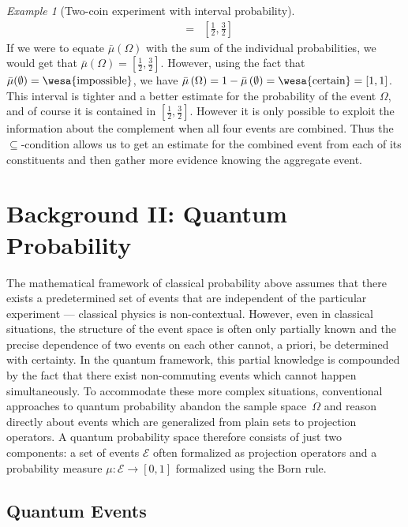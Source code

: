 \documentclass{article}
\theoremstyle{remark}
\newtheorem{example}{Example}
\newcommand{\qevents}{\ensuremath{\mathcal{E}}}
\newcommand{\imposs}{{\mbox{\wesa{impossible}}}}
\newcommand{\necess}{{\mbox{\wesa{certain}}}}
\begin{document}
\begin{example}[Two-coin experiment with interval probability]
\begin{eqnarray*}
&=& \left[\frac{1}{2},\frac{3}{2}\right]
\end{eqnarray*}
If we were to equate $\bar{\mu}(\Omega)$ with the sum of the individual
probabilities, we would get that $\bar{\mu}(\Omega)=\left[\frac{1}{2},\frac{3}{2}\right]$.
However, using the fact that $\bar{\mu}(\emptyset)=\imposs$, we have
$\bar{\mu}\left(\Omega\right)=1-\bar{\mu}\left(\emptyset\right)=\necess=[1,1]$.
This interval is tighter and a better estimate for the probability
of the event $\Omega$, and of course it is contained in $[\frac{1}{2},\frac{3}{2}]$.
However it is only possible to exploit the information about the complement
when all four events are combined. Thus the $\subseteq$-condition
allows us to get an estimate for the combined event from each of its
constituents and then gather more evidence knowing the aggregate
event.
\end{example}

\section{Background II: Quantum Probability}
 
The mathematical framework of classical probability above assumes that
there exists a predetermined set of events that are independent of the
particular experiment --- classical physics is
non-contextual. However, even in classical situations, the structure
of the event space is often only partially known and the precise
dependence of two events on each other cannot, a priori, be determined
with certainty. In the quantum framework, this partial knowledge is
compounded by the fact that there exist non-commuting events which
cannot happen simultaneously. To accommodate these more complex
situations, conventional approaches to quantum probability abandon the
sample space~$\Omega$ and reason directly about events which are
generalized from plain sets to projection operators. A quantum
probability space therefore consists of just two components: a set of
events $\qevents$ often formalized as projection operators and a
probability measure $\mu:\qevents\rightarrow[0,1]$ formalized using
the Born rule.

\subsection{Quantum Events}
\end{document}
